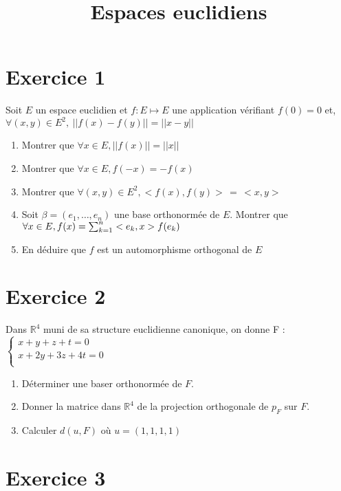 \documentclass[11pt]{article}
\author{\Name \texttt{\Login}}
\date{}
\title{Espaces euclidiens}
\begin{document}
\maketitle

\section*{Exercice 1}

Soit $E$ un espace euclidien et $ f : E \mapsto E$ une application vérifiant $f(0)=0$ et, $\forall (x,y)\in E^2,\: ||f(x) - f(y)|| = ||x-y||$ 

\begin{enumerate}
\item Montrer que $ \forall x\in E, ||f(x)||=||x||$
\item Montrer que $ \forall x\in E, f(-x)=-f(x)$
\item Montrer que $ \forall (x,y)\in E^2
, <f(x),f(y)>\, =\, <x,y>$
\item Soit $ \beta=(e_1,\dots,e_n)$ une base orthonormée de $E$. Montrer que $\forall x\in E,\\ f(x) = \sum_{k=1}^n <e_k,x>f(e_k)$
\item En déduire que $f$ est un automorphisme orthogonal de $E$

\end{enumerate}


\section*{Exercice 2}

Dans $\mathbb{R}^4$ muni de sa structure euclidienne canonique, on donne F :
$ \left\{
\begin{array}{l}
  x + y + z + t =0 \\
  x + 2y + 3z + 4t =0 \\
\end{array}
\right.$
\begin{enumerate}
\item Déterminer une baser orthonormée de $F$.
\item Donner la matrice dans $\mathbb{R}^4$ de la projection orthogonale de $p_F$ sur $F$.
\item Calculer $d(u,F)$ où $u=(1,1,1,1)$
\end{enumerate}

\section*{Exercice 3}
\end{document}
